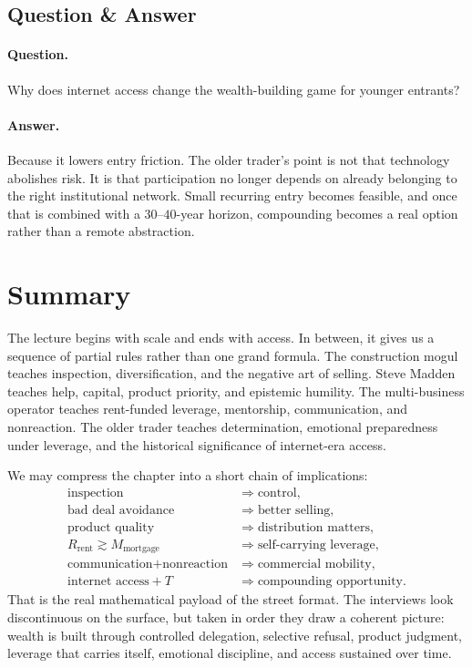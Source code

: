 \subsection{Question \& Answer}

\paragraph{Question.} Why does internet access change the wealth-building game for younger entrants?

\paragraph{Answer.} Because it lowers entry friction. The older trader's point is not that technology abolishes risk. It is that participation no longer depends on already belonging to the right institutional network. Small recurring entry becomes feasible, and once that is combined with a \(30\text{--}40\)-year horizon, compounding becomes a real option rather than a remote abstraction.

\section{Summary}

The lecture begins with scale and ends with access. In between, it gives us a sequence of partial rules rather than one grand formula. The construction mogul teaches inspection, diversification, and the negative art of selling. Steve Madden teaches help, capital, product priority, and epistemic humility. The multi-business operator teaches rent-funded leverage, mentorship, communication, and nonreaction. The older trader teaches determination, emotional preparedness under leverage, and the historical significance of internet-era access.

We may compress the chapter into a short chain of implications:
\begin{align}
\text{inspection} &\Rightarrow \text{control},\\
\text{bad deal avoidance} &\Rightarrow \text{better selling},\\
\text{product quality} &\Rightarrow \text{distribution matters},\\
R_{\text{rent}} \gtrsim M_{\text{mortgage}} &\Rightarrow \text{self-carrying leverage},\\
\text{communication} + \text{nonreaction} &\Rightarrow \text{commercial mobility},\\
\text{internet access} + T &\Rightarrow \text{compounding opportunity}.
\end{align}
That is the real mathematical payload of the street format. The interviews look discontinuous on the surface, but taken in order they draw a coherent picture: wealth is built through controlled delegation, selective refusal, product judgment, leverage that carries itself, emotional discipline, and access sustained over time.